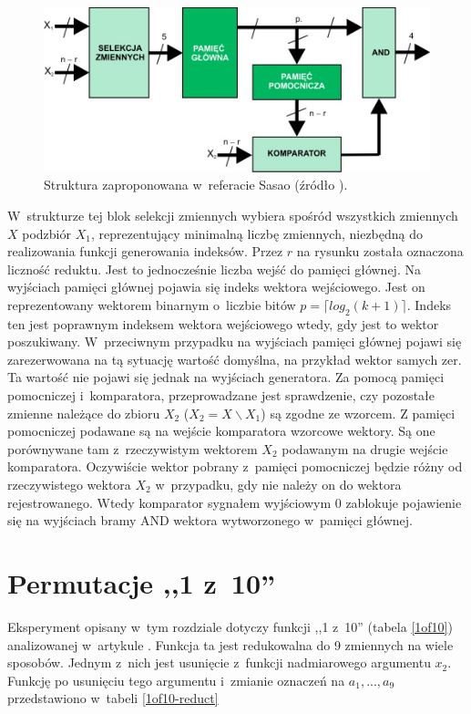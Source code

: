 \begin{figure}[H]
\centering
\includegraphics[width = 13cm]{chapter04/sasao-structure.jpg}
\caption{Struktura zaproponowana w~referacie Sasao (źródło \cite{sasao-workshop}).}
\label{fig:sasao-structure}
\end{figure}

W~strukturze tej blok selekcji zmiennych wybiera spośród wszystkich zmiennych $X$ podzbiór $X_1$,
reprezentujący minimalną liczbę zmiennych,
niezbędną do realizowania funkcji generowania indeksów.
Przez $r$ na rysunku została oznaczona liczność reduktu.
Jest to jednocześnie liczba wejść do pamięci głównej.
Na wyjściach pamięci głównej pojawia się indeks wektora wejściowego. %
Jest on reprezentowany wektorem binarnym o~liczbie bitów $p = \lceil log_2 (k+1)\rceil$.
Indeks ten jest poprawnym indeksem wektora wejściowego wtedy,
gdy jest to wektor poszukiwany.
W~przeciwnym przypadku na wyjściach pamięci głównej pojawi się zarezerwowana na tą sytuację wartość domyślna,
na przykład wektor samych zer.
Ta wartość nie pojawi się jednak na wyjściach generatora.
Za pomocą pamięci pomocniczej i~komparatora,
przeprowadzane jest sprawdzenie,
czy pozostałe zmienne należące do zbioru $X_2$ ($X_2 = X \backslash X_1$) są zgodne ze wzorcem.
Z pamięci pomocniczej podawane są na wejście komparatora wzorcowe wektory.
Są one porównywane tam z~rzeczywistym wektorem $X_2$ podawanym na drugie wejście komparatora.
Oczywiście wektor pobrany z~pamięci pomocniczej będzie różny od rzeczywistego wektora $X_2$ w~przypadku,
gdy nie należy on do wektora rejestrowanego.
Wtedy komparator sygnałem wyjściowym 0 zablokuje pojawienie się na wyjściach bramy AND wektora wytworzonego w~pamięci głównej.

\section{Permutacje ,,1 z~10''}

Eksperyment opisany w~tym rozdziale dotyczy funkcji ,,1 z~10'' (tabela \ref{1of10}) analizowanej w~artykule \cite{sasao-s-min}.
Funkcja ta jest redukowalna do 9 zmiennych na wiele sposobów.
Jednym z~nich jest usunięcie z~funkcji nadmiarowego argumentu $x_2$.
Funkcję po usunięciu tego argumentu i~zmianie oznaczeń na $a_1, ..., a_9$ przedstawiono w~tabeli \ref{1of10-reduct}

